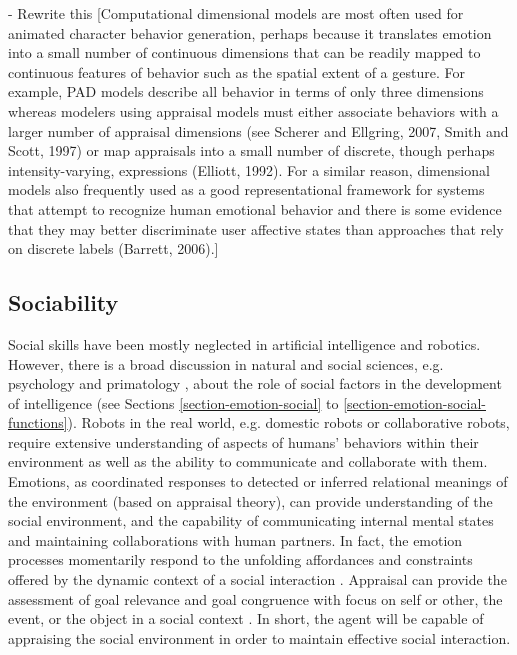 \documentclass[11pt]{article}
\begin{document}
- Rewrite this [Computational dimensional models are most often used for
animated character behavior generation, perhaps because it translates emotion
into a small number of continuous dimensions that can be readily mapped to
continuous features of behavior such as the spatial extent of a gesture. For
example, PAD models describe all behavior in terms of only three dimensions
whereas modelers using appraisal models must either associate behaviors with a
larger number of appraisal dimensions (see Scherer and Ellgring, 2007, Smith and
Scott, 1997) or map appraisals into a small number of discrete, though perhaps
intensity-varying, expressions (Elliott, 1992). For a similar reason,
dimensional models also frequently used as a good representational framework for
systems that attempt to recognize human emotional behavior and there is some
evidence that they may better discriminate user affective states than approaches
that rely on discrete labels (Barrett, 2006).]

\subsection{Sociability}
Social skills have been mostly neglected in artificial intelligence and
robotics. However, there is a broad discussion in natural and social sciences,
e.g. psychology and primatology \cite{beheshtifar:social-intelligence-leadership,
bradberry:ability-skill-intelligence, keating:search-social-intelligence,
wexler:emotional-intelligence-appraisal, worden:primate-social-intelligence},
about the role of social factors in the development of intelligence
\cite{dautenhahn:social-autonomous-robots} (see Sections
\ref{section-emotion-social} to \ref{section-emotion-social-functions}). Robots
in the real world, e.g. domestic robots or collaborative robots, require
extensive understanding of aspects of humans' behaviors within their environment
as well as the ability to communicate and collaborate with them. Emotions, as
coordinated responses to detected or inferred relational meanings of the
environment (based on appraisal theory), can provide understanding of the social
environment, and the capability of communicating internal mental states and
maintaining collaborations with human partners. In fact, the emotion processes
momentarily respond to the unfolding affordances and constraints offered by the
dynamic context of a social interaction \cite{parkinson:holds-emotion}.
Appraisal can provide the assessment of goal relevance and goal congruence with
focus on self or other, the event, or the object in a social context
\cite{parrott:appraisal-social-emotions}. In short, the agent will be capable of
appraising the social environment in order to maintain effective social
interaction.
\end{document}
